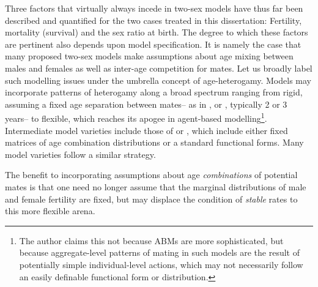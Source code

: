 Three factors that virtually always incede in two-sex models have
thus far been described and quantified for the two cases treated in this
dissertation: Fertility, mortality (survival) and the sex ratio at birth. The
degree to which these factors are pertinent also depends upon model
specification. It is namely the case that many proposed two-sex models make
assumptions about age mixing between males and females as well as inter-age
competition for mates. Let us broadly label such modelling issues under the
umbrella concept of age-heterogamy. Models may incorporate patterns of
heterogamy along a broad spectrum ranging from rigid, assuming a fixed age
separation between mates-- as in \citet{cabre1997tortulos},
\citet{karmel1947relations} or \citet{akers1967measuring}, typically 2 or 3
years-- to flexible, which reaches its apogee in agent-based
modelling\footnote{The author claims this not because ABMs are more
sophisticated, but because aggregate-level patterns of mating in such models are
the result of potentially simple individual-level actions, which may not
necessarily follow an easily definable functional form or distribution.}.
Intermediate model varieties include those of \citet[e.g.]{gupta1972two} or
\citet{schoen1981harmonic}, which include either fixed matrices of age
combination distributions or a standard functional forms. Many model varieties
follow a similar strategy.  

The benefit to incorporating assumptions about age \textit{combinations} of
potential mates is that one need no longer assume that the marginal
distributions of male and female fertility are fixed, but may displace the
condition of \textit{stable} rates to this more flexible arena. 






